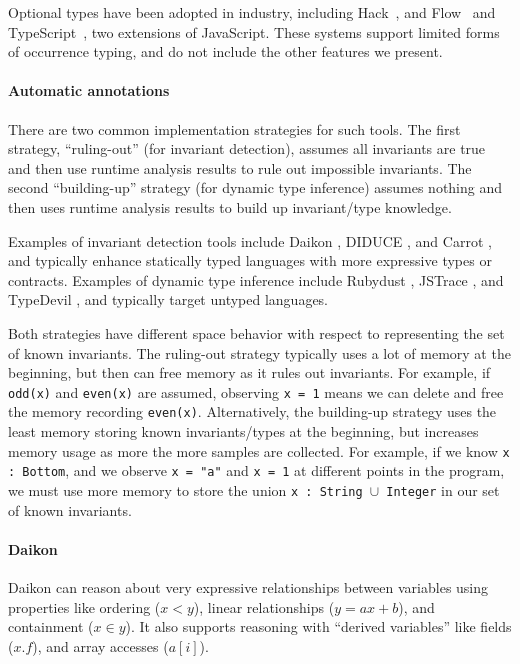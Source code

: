 \documentclass[9pt]{extarticle}
\begin{document}
Optional types
have been  adopted in industry, including Hack~\cite{hack}, and Flow~\cite{flow} and
TypeScript~\cite{typescript}, two extensions of JavaScript. These
systems  support  limited forms of occurrence typing,
and do not include the other features we
present.


\paragraph{Automatic annotations}
There are two common implementation strategies for such tools. The first
strategy, ``ruling-out'' (for invariant detection), assumes all invariants are true 
and then use runtime analysis results to rule out
impossible invariants. The second ``building-up'' strategy (for dynamic type inference)
assumes nothing and then uses runtime analysis results to build up invariant/type knowledge.

Examples of invariant detection tools include Daikon \cite{Ernst06thedaikon},
DIDUCE \cite{hangal2002tracking}, and Carrot \cite{pytlik2003automated}, and
typically enhance statically typed languages with more expressive types or contracts.
Examples of dynamic type inference include Rubydust \cite{An10dynamicinference},
JSTrace \cite{saftoiu2010jstrace}, and TypeDevil \cite{pradel2015typedevil},
and typically target untyped languages.

Both strategies have different space behavior with respect to representing
the set of known invariants.
The ruling-out strategy typically uses a lot of memory at the beginning,
but then can free memory as it rules out invariants. For example, if
\texttt{odd(x)} and \texttt{even(x)} are assumed, observing \texttt{x = 1}
means we can delete and free the memory recording \texttt{even(x)}.
Alternatively, the building-up strategy uses the least memory storing
known invariants/types at the beginning, but increases memory usage
as more the more samples are collected. For example, if we know
\texttt{x : Bottom}, and we observe \texttt{x = "a"} and \texttt{x = 1}
at different points in the program, we must use more memory to
store the union \texttt{x : String $\cup$ Integer} in our set of known invariants.

\paragraph{Daikon}
Daikon can reason about very expressive relationships between variables
using properties like ordering ($x < y$), linear relationships ($y = ax + b$),
and containment ($x \in y$). It also supports reasoning with ``derived variables''
like fields ($x.f$), and array accesses ($a[i]$).
\end{document}
